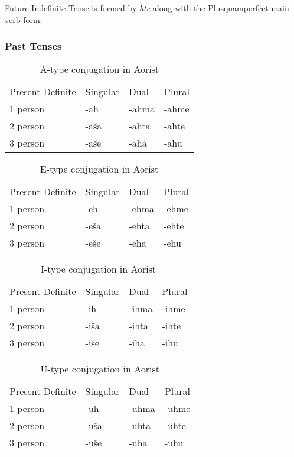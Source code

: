 Future Indefinite Tense is formed by \textit{hte} along with the Plusquamperfect main verb form.

\subsubsection{Past Tenses}

\begin{table}[!htb]
	\caption{A-type conjugation in Aorist}
	\begin{tabular}{llll}
		Present Definite & Singular & Dual & Plural \\
		1 person & -ah & -ahma & -ahme \\
		2 person & -aša & -ahta & -ahte \\
		3 person & -aše & -aha & -ahu
	\end{tabular}
\end{table}

\begin{table}[!htb]
	\caption{E-type conjugation in Aorist}
	\begin{tabular}{llll}
		Present Definite & Singular & Dual & Plural \\
		1 person & -eh & -ehma & -ehme \\
		2 person & -eša & -ehta & -ehte \\
		3 person & -eše & -eha & -ehu
	\end{tabular}
\end{table}

\begin{table}[!htb]
	\caption{I-type conjugation in Aorist}
	\begin{tabular}{llll}
		Present Definite & Singular & Dual & Plural \\
		1 person & -ih & -ihma & -ihme \\
		2 person & -iša & -ihta & -ihte \\
		3 person & -iše & -iha & -ihu
	\end{tabular}
\end{table}

\begin{table}[!htb]
	\caption{U-type conjugation in Aorist}
	\begin{tabular}{llll}
		Present Definite & Singular & Dual & Plural \\
		1 person & -uh & -uhma & -uhme \\
		2 person & -uša & -uhta & -uhte \\
		3 person & -uše & -uha & -uhu
	\end{tabular}
\end{table}

